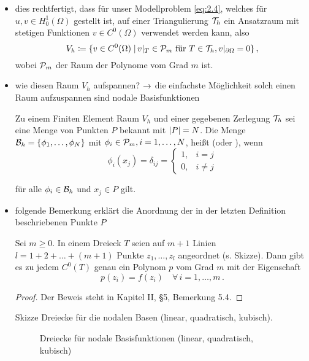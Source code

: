 \begin{itemize}
\item dies rechtfertigt, dass für unser Modellproblem \eqref{eq:2.4}, welches für $u,v \in H^1_0(\Omega)$ gestellt ist, auf einer Triangulierung $\mathcal T_h$ ein Ansatzraum mit stetigen Funktionen $v \in C^0(\Omega)$ verwendet werden kann, also
\[
	V_h \coloneqq \{v \in C^0(\Omega) \;\vert\, v|_T \in \mathcal P_m \text{ für } T\in \mathcal T_h, v|_{\partial \Omega} = 0\} \, ,
\]
wobei $\mathcal P_m$ der Raum der Polynome vom Grad $m$ ist.

\item wie diesen Raum $V_h$ aufspannen? $\rightarrow $ die einfachste Möglichkeit solch einen Raum aufzuspannen sind nodale Basisfunktionen
\begin{defi}
Zu einem Finiten Element Raum $V_h$ und einer gegebenen Zerlegung $\mathcal T_h$ sei eine Menge von Punkten $P$ bekannt mit $\lvert P\rvert = N$. Die Menge $\mathcal B_h = \{\phi_1,\ldots,\phi_N\}$ mit $\phi_i \in \mathcal P_m, i = 1,\ldots, N$, heißt \textit{} (oder \textit{}), wenn
\[
	\phi_i (x_j) = \delta_{ij} = \begin{cases}
							1, &  i = j \\
							0 ,& i \not = j
						\end{cases} %
\]
\end{defi}
für alle $\phi_i \in \mathcal B_h$ und $x_j \in P$ gilt.

\item folgende Bemerkung erklärt die Anordnung der in der letzten Definition beschriebenen Punkte $P$ 
\begin{bem}
Sei $m \ge 0$. In einem Dreieck $T$ seien auf $m+1$ Linien $l = 1+2+\ldots+(m+1)$ Punkte $z_1,\ldots,z_l$ angeordnet (s. Skizze). Dann gibt es zu jedem $C^0(T)$ genau ein Polynom $p$ vom Grad $m$ mit der Eigenschaft
\[
	p(z_i) = f(z_i) \quad \forall \, i = 1,\ldots,m \, .
\]

\begin{proof}
Der Beweis steht in \cite{BraeFEM} Kapitel II, \S 5, Bemerkung 5.4.
\end{proof}
\end{bem}

\item[Skizze] Dreiecke für die nodalen Basen (linear, quadratisch, kubisch).

\begin{figure}[h]
\caption{Dreiecke für nodale Basisfunktionen (linear, quadratisch, kubisch)}
\end{figure}


\end{itemize}
